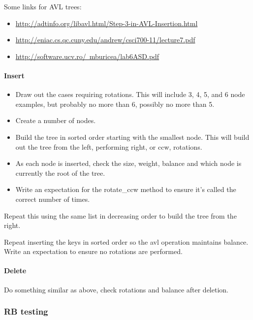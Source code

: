 \documentclass{article}
\begin{document}
Some links for AVL trees:

\begin{itemize}
\item  \href{http://adtinfo.org/libavl.html/Step-3-in-AVL-Insertion.html}{%
http://adtinfo.org/libavl.html/Step-3-in-AVL-Insertion.html}
\item \href{http://eniac.cs.qc.cuny.edu/andrew/csci700-11/lecture7.pdf}{%
http://eniac.cs.qc.cuny.edu/andrew/csci700-11/lecture7.pdf}
\item \href{http://software.ucv.ro/~mburicea/lab6ASD.pdf}{%
http://software.ucv.ro/~mburicea/lab6ASD.pdf}
\end{itemize}

\paragraph{Insert}

\begin{itemize}
\item Draw out the cases requiring rotations. This will include 3, 4, 5, and 6
node examples, but probably no more than 6, possibly no more than 5.
\item Create a number of nodes.
\item Build the tree in sorted order starting with the smallest node.
This will build out the tree from the left, performing right, or ccw, rotations.
\item As each node is inserted, check the size, weight, balance and which node is currently the root of the tree.
\item Write an expectation for the rotate\_ccw method to ensure it's called the correct number of times.
\end{itemize}

Repeat this using the same list in decreasing order to build the tree from the
right.

Repeat inserting the keys in sorted order so the avl operation maintains
balance. Write an expectation to ensure no rotations are performed.



\paragraph{Delete}

Do something similar as above, check
rotations and balance after deletion.


\subsubsection{RB testing}
\end{document}
